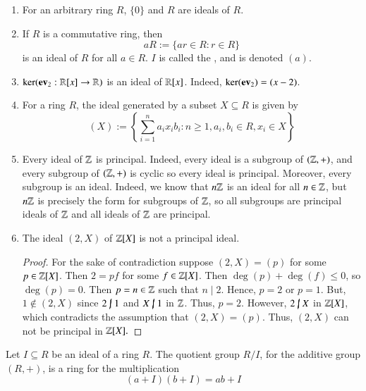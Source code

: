 \begin{eg}
    \leavevmode
    \begin{enumerate}
        \item For an arbitrary ring $R$, $\{0\}$ and $R$ are ideals of $R$.
        \item If $R$ is a commutative ring, then \begin{equation}
            aR := \{ar \in R: r \in R\}
        \end{equation}
        is an ideal of $R$ for all $a \in R$. $I$ is called the , and is denoted $(a)$.
        \item $\ker(\operatorname{\bf{ev}}_2:\mathbb R[x]\rightarrow \mathbb R)$ is an ideal of $\mathbb R[x]$. Indeed, $\ker(\operatorname{\bf{ev}}_2) = (x-2)$.
        \item For a ring $R$, the ideal generated by a subset $X \subseteq R$ is given by \begin{equation}
            (X) := \left\{\sum\limits_{i=1}^na_ix_ib_i: n \geq 1, a_i,b_i \in R, x_i \in X\right\}
        \end{equation}
        \item Every ideal of $\mathbb Z$ is principal. Indeed, every ideal is a subgroup of $(\mathbb Z,+)$, and every subgroup of $(\mathbb Z,+)$ is cyclic so every ideal is principal. Moreover, every subgroup is an ideal. Indeed, we know that $n\mathbb Z$ is an ideal for all $n \in \mathbb Z$, but $n\mathbb Z$ is precisely the form for subgroups of $\mathbb Z$, so all subgroups are principal ideals of $\mathbb Z$ and all ideals of $\mathbb Z$ are principal.
        \item The ideal $(2,X)$ of $\mathbb Z[X]$ is not a principal ideal.
        \begin{proof}
            For the sake of contradiction suppose $(2,X) = (p)$ for some $p \in \mathbb Z[X]$. Then $2 = pf$ for some $f \in \mathbb Z[X]$. Then $\deg(p) + \deg(f) \leq 0$, so $\deg(p) = 0$. Then $p = n \in \mathbb Z$ such that $n\;\vert\;2$. Hence, $p = 2$ or $p = 1$. But, $1 \notin (2,X)$ since $2 \;\cancel{\vert}\;1$ and $X\;\cancel{\vert}\;1$ in $\mathbb Z$. Thus, $p = 2$. However, $2\;\cancel{\vert}\;X$ in $\mathbb Z[X]$, which contradicts the assumption that $(2,X) = (p)$. Thus, $(2,X)$ can not be principal in $\mathbb Z[X].$
        \end{proof}
    \end{enumerate}
\end{eg}


\begin{defn}
    Let $I \subseteq R$ be an ideal of a ring $R$. The quotient group $R/I$, for the additive group $(R,+)$, is a ring for the multiplication \begin{equation}
        (a+I)(b+I) = ab+I \tag{$\star$}\label{eq:quot_ring}
    \end{equation}
\end{defn}

